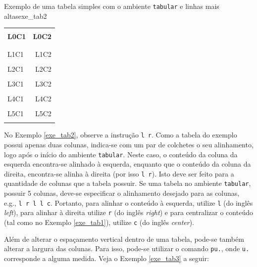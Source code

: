 \begin{texexptitled}[breakable,center lower,enhanced,middle=2mm]{Exemplo de uma tabela simples com o ambiente {\tt tabular} e linhas mais altas}{exe_tab2}
\begin{tabular}{l r}
\hline 
\\[-0.5em]
\textbf{L0C1} & \textbf{L0C2} \\
\\[-0.5em]
\hline
\\[-0.5em]
L1C1 & L1C2 \\
\\[-0.5em]
L2C1 & L2C2 \\
\\[-0.5em]
L3C1 & L3C2 \\
\\[-0.5em]
L4C1 & L4C2 \\
\\[-0.5em]
L5C1 & L5C2 \\
\\[-0.5em]
\hline
\end{tabular}
\end{texexptitled}

No Exemplo \ref{exe_tab2}, observe a instrução \texttt{{l r}}. Como a tabela do exemplo possui apenas duas colunas, indica-se com um par de colchetes o seu alinhamento, logo após o início do ambiente {\tt tabular}. Neste caso, o conteúdo da coluna da esquerda encontra-se alinhado à esquerda, enquanto que o conteúdo da coluna da direita, encontra-se alinha à direita (por isso {\tt l r}). Isto deve ser feito para a quantidade de colunas que a tabela possuir. Se uma tabela no ambiente {\tt tabular}, possuir 5 colunas, deve-se especificar o alinhamento desejado para as colunas, e.g., \texttt{{l r l l c}}. Portanto, para alinhar o conteúdo à esquerda, utilize {\tt l} (do inglês \textit{left}), para alinhar à direita utilize {\tt r} (do inglês \textit{right}) e para centralizar o conteúdo (tal como no Exemplo \ref{exe_tab1}), utilize {\tt c} (do inglês \textit{center}).

Além de alterar o espaçamento vertical dentro de uma tabela, pode-se também alterar a largura das colunas. Para isso, pode-se utilizar o comando \texttt{p{u.}}, onde {\tt u.} corresponde a alguma medida. Veja o Exemplo \ref{exe_tab3} a seguir:

